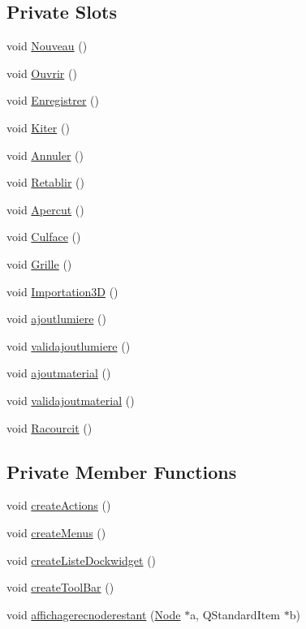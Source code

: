 \subsection*{Private Slots}
\begin{DoxyCompactItemize}
\item 
void \hyperlink{class_main_window_a6f837f331c40d27e47fbb0d6a73b040e}{Nouveau} ()
\item 
void \hyperlink{class_main_window_adbc60f34a13a49cc015dc4a124a588a1}{Ouvrir} ()
\item 
void \hyperlink{class_main_window_a8c07d91b87178ac0a1b88aabc45c6ddb}{Enregistrer} ()
\item 
void \hyperlink{class_main_window_a4558a3ff95a78f4a0e0d0adf312a6b8c}{Kiter} ()
\item 
void \hyperlink{class_main_window_a5277087cb1c0b01722b7a4ff436070ba}{Annuler} ()
\item 
void \hyperlink{class_main_window_ab2ff5da91852950471811fa93028dc0c}{Retablir} ()
\item 
void \hyperlink{class_main_window_a019328eaf07af3c9b8850e3db14fdf30}{Apercut} ()
\item 
void \hyperlink{class_main_window_a0b391dfd82e868b6f8badbc9717d6f49}{Culface} ()
\item 
void \hyperlink{class_main_window_a9a4d5849cf40a3ce50941e56cfa0be35}{Grille} ()
\item 
void \hyperlink{class_main_window_af26018b1d699cbf0a3f62048472cc489}{Importation3\+D} ()
\item 
void \hyperlink{class_main_window_a42d29fe9a2657a5c5563b3f1235a28e4}{ajoutlumiere} ()
\item 
void \hyperlink{class_main_window_a56f65a459f0caca9f71251663b200431}{validajoutlumiere} ()
\item 
void \hyperlink{class_main_window_a3a599353265f9c01a8780529aa5fed75}{ajoutmaterial} ()
\item 
void \hyperlink{class_main_window_a2d8cee622b78ccdeed758c51b9fb5b0e}{validajoutmaterial} ()
\item 
void \hyperlink{class_main_window_abd2acb261445354d2fd680c9b48bad77}{Racourcit} ()
\end{DoxyCompactItemize}
\subsection*{Private Member Functions}
\begin{DoxyCompactItemize}
\item 
void \hyperlink{class_main_window_a62cd8712fb41a754298f6f60eead2cb0}{create\+Actions} ()
\item 
void \hyperlink{class_main_window_aa4907b0251d305659e403c62921ef331}{create\+Menus} ()
\item 
void \hyperlink{class_main_window_a7b7fd06b9e7bfc83904b1d5b6503e9e9}{create\+Liste\+Dockwidget} ()
\item 
void \hyperlink{class_main_window_aeb57235ebc08860e680132db167c09b4}{create\+Tool\+Bar} ()
\item 
void \hyperlink{class_main_window_a9db31c33ce466950590bb5271412cc86}{affichagerecnoderestant} (\hyperlink{class_node}{Node} $\ast$a, Q\+Standard\+Item $\ast$b)
\end{DoxyCompactItemize}
